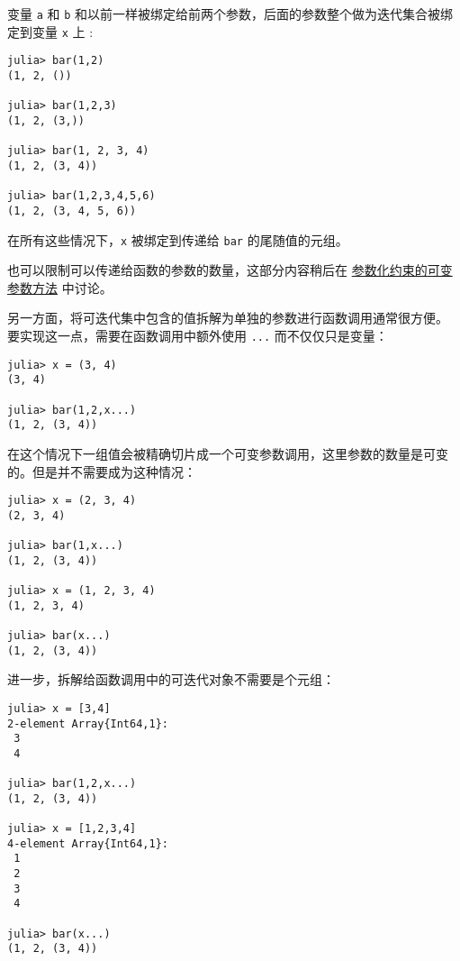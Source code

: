 变量 \texttt{a} 和 \texttt{b} 和以前一样被绑定给前两个参数，后面的参数整个做为迭代集合被绑定到变量 \texttt{x} 上 :




\begin{verbatim}
julia> bar(1,2)
(1, 2, ())

julia> bar(1,2,3)
(1, 2, (3,))

julia> bar(1, 2, 3, 4)
(1, 2, (3, 4))

julia> bar(1,2,3,4,5,6)
(1, 2, (3, 4, 5, 6))
\end{verbatim}



在所有这些情况下，\texttt{x} 被绑定到传递给 \texttt{bar} 的尾随值的元组。



也可以限制可以传递给函数的参数的数量，这部分内容稍后在  \hyperlink{14394864568540094383}{参数化约束的可变参数方法}  中讨论。



另一方面，将可迭代集中包含的值拆解为单独的参数进行函数调用通常很方便。 要实现这一点，需要在函数调用中额外使用 \texttt{...} 而不仅仅只是变量：




\begin{verbatim}
julia> x = (3, 4)
(3, 4)

julia> bar(1,2,x...)
(1, 2, (3, 4))
\end{verbatim}



在这个情况下一组值会被精确切片成一个可变参数调用，这里参数的数量是可变的。但是并不需要成为这种情况：




\begin{verbatim}
julia> x = (2, 3, 4)
(2, 3, 4)

julia> bar(1,x...)
(1, 2, (3, 4))

julia> x = (1, 2, 3, 4)
(1, 2, 3, 4)

julia> bar(x...)
(1, 2, (3, 4))
\end{verbatim}



进一步，拆解给函数调用中的可迭代对象不需要是个元组：




\begin{verbatim}
julia> x = [3,4]
2-element Array{Int64,1}:
 3
 4

julia> bar(1,2,x...)
(1, 2, (3, 4))

julia> x = [1,2,3,4]
4-element Array{Int64,1}:
 1
 2
 3
 4

julia> bar(x...)
(1, 2, (3, 4))
\end{verbatim}



